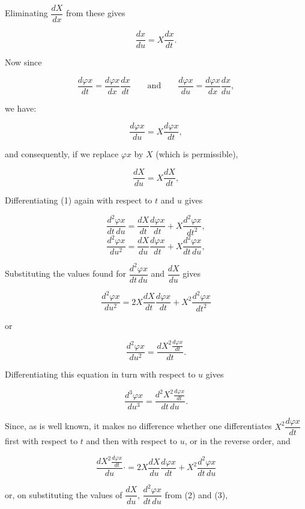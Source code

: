 
\noindent
Eliminating $\dfrac{dX}{dx}$ from these gives

\[
\frac{dx}{du} = X\frac{dx}{dt}.
\]

\noindent
Now since

\[
\frac{d\varphi x}{dt} = \frac{d\varphi x}{dx}\frac{dx}{dt} \qquad \text{and} \qquad
\frac{d\varphi x}{du} = \frac{d\varphi x}{dx}\frac{dx}{du},
\]

\noindent
we have:

\begin{equation}\tag{1}
\frac{d\varphi x}{du} = X\frac{d\varphi x}{dt},
\end{equation}

\noindent
and consequently, if we replace $\varphi x$ by $X$ (which is permissible),

\begin{equation}\tag{2}
\frac{dX}{du} = X\frac{dX}{dt},
\end{equation}

\noindent
Differentiating (1) again with respect to $t$ and $u$ gives

\begin{equation}\tag{3}
\frac{d^2\varphi x}{dt\,du}=\frac{dX}{dt}\frac{d\varphi x}{dt}+X\frac{d^2\varphi x}{dt^2},
\end{equation}
\[
\frac{d^2\varphi x}{du^2}=\frac{dX}{du}\frac{d\varphi x}{dt}+X\frac{d^2\varphi x}{dt\,du},
\]

\noindent
Substituting the values found for $\dfrac{d^2\varphi x}{dt\,du}$ and $\dfrac{dX}{du}$
gives

\[
\frac{d^2\varphi x}{du^2} = 2X\frac{dX}{dt}\frac{d\varphi x}{dt} + X^2\frac{d^2\varphi x}{dt^2}
\]

\noindent
or

\begin{equation}\tag{4}
\frac{d^2\varphi x}{du^2} = \frac{dX^2 \frac{d\varphi x}{dt}}{dt}.
\end{equation}

\noindent
Differentiating this equation in turn with respect to $u$ gives

\[
\frac{d^3\varphi x}{du^3} = \frac{d^2X^2 \frac{d\varphi x}{dt}}{dt\,du}.
\]

\noindent\hspace*{\parindent}Since, as is well known, it makes no difference whether one differentiates $X^2\dfrac{d\varphi x}{dt}$ first with respect to
$t$ and then with respect to $u$, or in the reverse order, and

\[
\frac{dX^2 \frac{d\varphi x}{dt}}{du}\mathord{\cdot} = 2X\frac{dX}{du}\frac{d\varphi x}{dt} + X^2\frac{d^2\varphi x}{dt\,du}
\]

\noindent
or, on substituting the values of $\dfrac{dX}{du}$, $\dfrac{d^2\varphi x}{dt\,du}$ from
(2) and (3),
